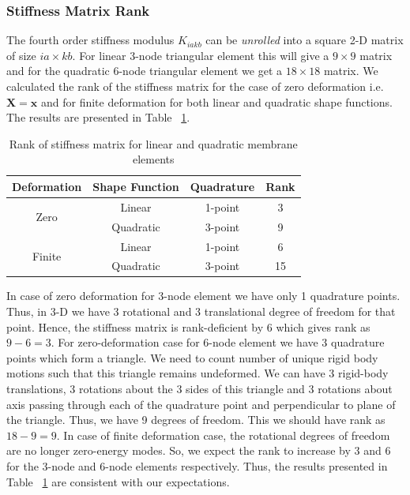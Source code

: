 \documentclass[../main.tex]{subfiles}
\begin{document}
\subsubsection{Stiffness Matrix Rank}
The fourth order stiffness modulus $K_{iakb}$ can be \textit{unrolled}
into a square 2-D matrix of size $ia\times kb$. For linear 3-node
triangular element this will give a $9\times9$ matrix and for the
quadratic 6-node triangular element we get a $18\times18$ matrix. We
calculated the rank of the stiffness matrix for the case of zero
deformation i.e. $\mathbf{X}=\mathbf{x}$ and for finite deformation
for both linear and quadratic shape functions. The results are
presented in Table ~\ref{tab:rank}.
\begin{table}
  \centering
  \caption{Rank of stiffness matrix for linear and quadratic membrane elements}
  \label{tab:rank}
  \begin{tabular}{|c|c|c|c|}
    \hline
    Deformation & Shape Function & Quadrature & Rank \\
    \hline
    \multirow{2}{*}{Zero} & Linear & 1-point & 3 \\
    \cline{2-4}                
                & Quadratic & 3-point & 9 \\
    \hline
    \multirow{2}{*}{Finite} & Linear & 1-point & 6 \\
    \cline{2-4}                
                & Quadratic & 3-point & 15 \\
    \hline
  \end{tabular}
\end{table}
In case of zero deformation for 3-node element we have only 1
quadrature points. Thus, in 3-D we have 3 rotational and 3
translational degree of freedom for that point. Hence, the stiffness
matrix is rank-deficient by 6 which gives rank as $9 - 6 = 3$. For
zero-deformation case for 6-node element we have 3 quadrature points
which form a triangle. We need to count number of unique rigid body
motions such that this triangle remains undeformed. We can have 3
rigid-body translations, 3 rotations about the 3 sides of this
triangle and 3 rotations about axis passing through each of the
quadrature point and perpendicular to plane of the triangle. Thus, we
have 9 degrees of freedom. This we should have rank as $18-9=9$. In
case of finite deformation case, the rotational degrees of freedom are
no longer zero-energy modes. So, we expect the rank to increase by 3
and 6 for the 3-node and 6-node elements respectively. Thus, the
results presented in Table ~\ref{tab:rank} are consistent with our
expectations.
\end{document}
